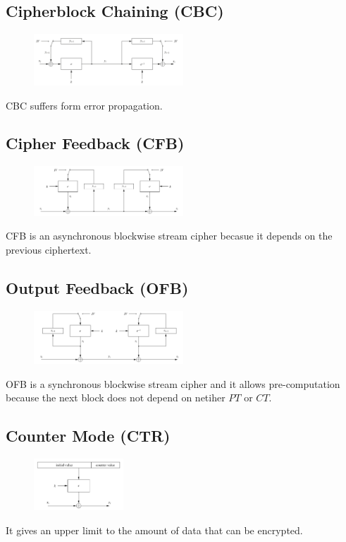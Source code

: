\documentclass[a4paper,12pt]{article}
\begin{document}
\subsection{Cipherblock Chaining (CBC)}
\begin{figure}[H]
  \centering
  \includegraphics[width=0.5\textwidth]{img/cbc}
\end{figure}
CBC suffers form error propagation.

\subsection{Cipher Feedback (CFB)}
\begin{figure}[H]
  \centering
  \includegraphics[width=0.5\textwidth]{img/cfb}
\end{figure}
CFB is an asynchronous blockwise stream cipher becasue it depends on the previous ciphertext.

\subsection{Output Feedback (OFB)}
\begin{figure}[H]
  \centering
  \includegraphics[width=0.5\textwidth]{img/ofb}
\end{figure}
OFB is a synchronous blockwise stream cipher and it allows pre-computation because the next block does not depend on netiher $PT$ or $CT$.

\subsection{Counter Mode (CTR)}
\begin{figure}[H]
  \centering
  \includegraphics[width=0.3\textwidth]{img/ctr}
\end{figure}
It gives an upper limit to the amount of data that can be encrypted.
\end{document}
